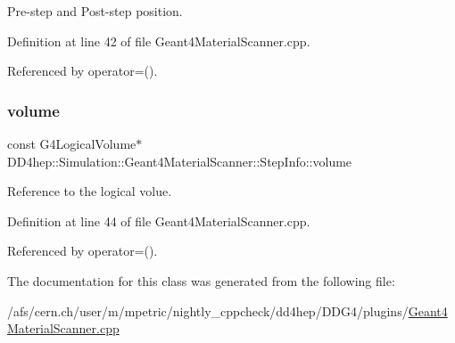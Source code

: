 Pre-\/step and Post-\/step position. 



Definition at line 42 of file Geant4\+Material\+Scanner.\+cpp.



Referenced by operator=().

\hypertarget{class_d_d4hep_1_1_simulation_1_1_geant4_material_scanner_1_1_step_info_ac413cc2216dfa5d0d174c48fd4acbe5b}{}\label{class_d_d4hep_1_1_simulation_1_1_geant4_material_scanner_1_1_step_info_ac413cc2216dfa5d0d174c48fd4acbe5b} 
\subsubsection{\texorpdfstring{volume}{volume}}
{\footnotesize\ttfamily const G4\+Logical\+Volume$\ast$ D\+D4hep\+::\+Simulation\+::\+Geant4\+Material\+Scanner\+::\+Step\+Info\+::volume}



Reference to the logical volue. 



Definition at line 44 of file Geant4\+Material\+Scanner.\+cpp.



Referenced by operator=().



The documentation for this class was generated from the following file\+:\begin{DoxyCompactItemize}
\item 
/afs/cern.\+ch/user/m/mpetric/nightly\+\_\+cppcheck/dd4hep/\+D\+D\+G4/plugins/\hyperlink{_geant4_material_scanner_8cpp}{Geant4\+Material\+Scanner.\+cpp}\end{DoxyCompactItemize}
